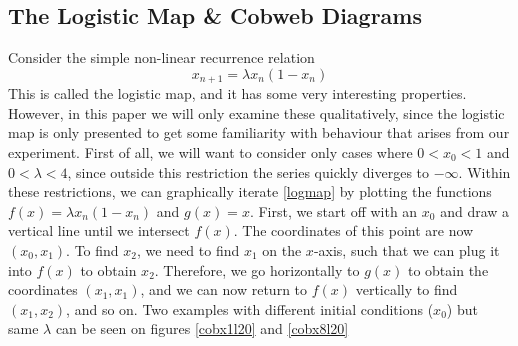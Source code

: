 \documentclass[12pt,oneside,a4paper]{article}
\numberwithin{equation}{section}
\begin{document}
{{{{\subsection{The Logistic Map \& Cobweb Diagrams}

Consider the simple non-linear recurrence relation
\begin{equation}
x_{n+1}=\lambda x_n (1-x_n)
\label{logmap}
\end{equation}
This is called the logistic map, and it has some very interesting properties. However, in this paper we will only examine these qualitatively, since the logistic map is only presented to get some familiarity with behaviour that arises from our experiment. First of all, we will want to consider only cases where $0<x_0<1$ and $0<\lambda<4$, since outside this restriction the series quickly diverges to $-\infty$. Within these restrictions, we can graphically iterate \eqref{logmap} by plotting the functions $f(x)=\lambda x_n (1-x_n)$ and $g(x)=x$. First, we start off with an $x_0$ and draw a vertical line until we intersect $f(x)$. The coordinates of this point are now $(x_0,x_1)$. To find $x_2$, we need to find $x_1$ on the $x$-axis, such that we can plug it into $f(x)$ to obtain $x_2$. Therefore, we go horizontally to $g(x)$ to obtain the coordinates $(x_1,x_1)$, and we can now return to $f(x)$ vertically to find $(x_1,x_2)$, and so on. Two examples with different initial conditions ($x_0$) but same $\lambda$ can be seen on figures \ref{cobx1l20} and \ref{cobx8l20}

}}}}
\end{document}
